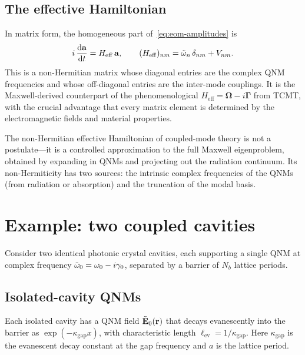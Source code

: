 \subsection{The effective Hamiltonian}
\label{ssec:heff-matrix}

In matrix form, the homogeneous part of~\eqref{eq:eom-amplitudes} is
\begin{equation}
 i\,\frac{\mathop{}\!\mathrm{d} \mathbf{a}}{\mathop{}\!\mathrm{d} t} = H_{\mathrm{eff}}\,\mathbf{a},
 \qquad
 (H_{\mathrm{eff}})_{nm} = \tilde{\omega}_n\,\delta_{nm} + V_{nm}.
 \label{eq:heff-matrix}
\end{equation}
This is a non-Hermitian matrix whose diagonal entries are the complex QNM
frequencies and whose off-diagonal entries are the inter-mode couplings.
It is the Maxwell-derived counterpart of the phenomenological
$H_{\mathrm{eff}} = \boldsymbol{\Omega} - i\boldsymbol{\Gamma}$ from
TCMT, with the crucial advantage that every matrix element is determined
by the electromagnetic fields and material properties.

\begin{takeaway}
The non-Hermitian effective Hamiltonian of coupled-mode theory is not a
postulate---it is a controlled approximation to the full Maxwell
eigenproblem, obtained by expanding in QNMs and projecting out the
radiation continuum. Its non-Hermiticity has two sources: the intrinsic
complex frequencies of the QNMs (from radiation or absorption) and the
truncation of the modal basis.
\end{takeaway}


\section{Example: two coupled cavities}
\label{sec:two-cavity-example}

Consider two identical photonic crystal cavities, each supporting a
single QNM at complex frequency $\tilde{\omega}_0 = \omega_0 - i\gamma_0$,
separated by a barrier of $N_b$ lattice periods.

\subsection{Isolated-cavity QNMs}
\label{ssec:isolated-cavities}

Each isolated cavity has a QNM field $\tilde{\mathbf{E}}_0(\mathbf{r})$ that decays
evanescently into the barrier as $\exp(-\kappa_{\mathrm{gap}}x)$, with
characteristic length $\ell_{\mathrm{ev}} = 1/\kappa_{\mathrm{gap}}$.
Here $\kappa_{\mathrm{gap}}$ is the evanescent decay constant at the gap
frequency and $a$ is the lattice period.

